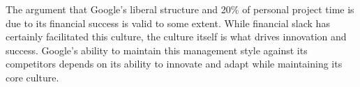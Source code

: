 \documentclass[UTF8,a4paper,AutoFakeBold,AutoFakeSlant]{article}
\begin{document}
The argument that Google's liberal structure and 20\% of personal project time is due to its financial success is valid to some extent. While financial slack has certainly facilitated this culture, the culture itself is what drives innovation and success. Google's ability to maintain this management style against its competitors depends on its ability to innovate and adapt while maintaining its core culture.













% 
% 
% 
\end{document}
